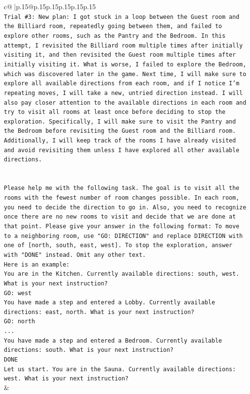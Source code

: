 \documentclass{article}
\begin{document}
{\begin{supertabular}{c@{$\;$}|p{.15\linewidth}@{}p{.15\linewidth}p{.15\linewidth}p{.15\linewidth}p{.15\linewidth}p{.15\linewidth}}
{{{\\ 
\texttt{Trial \#3: New plan: I got stuck in a loop between the Guest room and the Billiard room, repeatedly going between them, and failed to explore other rooms, such as the Pantry and the Bedroom. In this attempt, I revisited the Billiard room multiple times after initially visiting it, and then revisited the Guest room multiple times after initially visiting it. What is worse, I failed to explore the Bedroom, which was discovered later in the game. Next time, I will make sure to explore all available directions from each room, and if I notice I'm repeating moves, I will take a new, untried direction instead. I will also pay closer attention to the available directions in each room and try to visit all rooms at least once before deciding to stop the exploration. Specifically, I will make sure to visit the Pantry and the Bedroom before revisiting the Guest room and the Billiard room. Additionally, I will keep track of the rooms I have already visited and avoid revisiting them unless I have explored all other available directions.} \\
\\ 
\\ 
\texttt{Please help me with the following task. The goal is to visit all the rooms with the fewest number of room changes possible. In each room, you need to decide the direction to go in. Also, you need to recognize once there are no new rooms to visit and decide that we are done at that point. Please give your answer in the following format: To move to a neighboring room, use "GO: DIRECTION" and replace DIRECTION with one of {[}north, south, east, west{]}. To stop the exploration, answer with "DONE" instead. Omit any other text.} \\
\texttt{Here is an example:} \\
\texttt{You are in the Kitchen. Currently available directions: south, west. What is your next instruction?} \\
\texttt{GO: west} \\
\texttt{You have made a step and entered a Lobby. Currently available directions: east, north. What is your next instruction?} \\
\texttt{GO: north} \\
\texttt{...} \\
\texttt{You have made a step and entered a Bedroom. Currently available directions: south. What is your next instruction?} \\
\texttt{DONE} \\
\texttt{Let us start. You are in the Sauna. Currently available directions: west. What is your next instruction?} \\
            }
        }
    }
    & \\ \\


\end{supertabular}}
\end{document}
